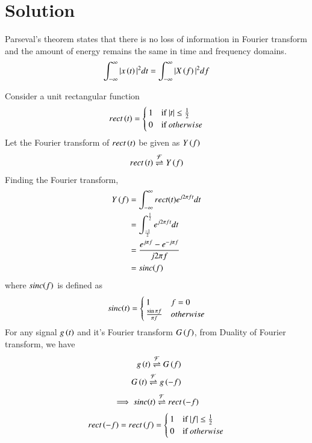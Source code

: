 \documentclass[journal,12pt,twocolumn]{IEEEtran}
\begin{document}
\section{Solution}
\begin{lemma}
Parseval's theorem states that there is no loss of information in Fourier transform and the amount of energy remains the same in time and frequency domains.
\begin{align}
    \int_{-\infty}^{\infty} |x\left(t\right)|^{2} dt = \int_{-\infty}^{\infty} |X\left(f\right)|^{2} df
\end{align}
\end{lemma}
Consider a unit rectangular function
\begin{align}
rect\left(t\right) =
    \begin{cases}
    1 & \text{if } |t| \leq \frac{1}{2}\\
    0 & \text{if } otherwise
    \end{cases}
\end{align}
Let the Fourier transform of $rect\left(t\right)$ be given as $Y\left(f\right)$
\begin{align}
    rect\left(t\right) \overset{\mathcal{F}}{ \rightleftharpoons}{Y} \left(f\right)
\end{align}
Finding the Fourier transform,
\begin{align}
    Y\left(f\right) &= \int_{-\infty}^{\infty} rect(t)e^{j2\pi ft}dt\\
    &= \int_{\frac{-1}{2}}^{\frac{1}{2}}e^{j2\pi ft}dt\\
    &= \frac{e^{j\pi f} - e^{-j\pi f}}{j2\pi f}\\
    &= sinc{\left(f\right)}
\end{align}
where $sinc{\left(f\right)}$ is defined as
\begin{align}
sinc{\left(t\right)} =
    \begin{cases}
    1 & f = 0\\
    \frac{\sin{\pi f}}{\pi f} & otherwise
    \end{cases}
\end{align}
For any signal $g\left(t\right)$ and it's Fourier transform $G\left(f\right)$, from Duality of Fourier transform, we have
\begin{align}
    g\left(t\right) \overset{\mathcal{F}}{ \rightleftharpoons}{G} \left(f\right)\\
    G\left(t\right) \overset{\mathcal{F}}{ \rightleftharpoons}{g} \left(-f\right)
\end{align}
\begin{align}
    \implies sinc{\left(t\right)} \overset{\mathcal{F}}{ \rightleftharpoons} rect\left(-f\right) 
\end{align}
\begin{align}
    rect\left(-f\right) = rect\left(f\right) = 
    \begin{cases}
    1 & \text{if } |f| \leq \frac{1}{2}\\
    0 & \text{if } otherwise
    \end{cases}
\end{align}
\end{document}
